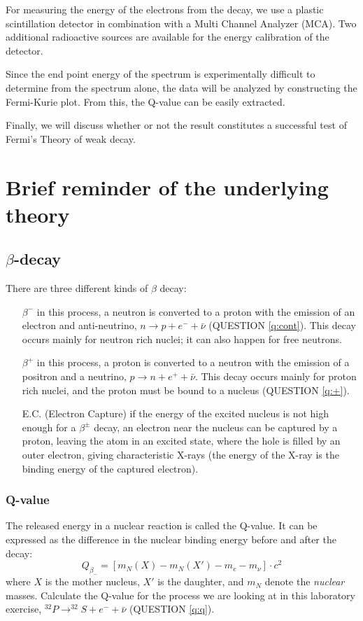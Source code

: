 \documentclass[a4,11pt, notitlepage]{article}
\begin{document}
For measuring the energy of the electrons from the decay, we use a
plastic scintillation detector in combination with a Multi Channel
Analyzer (MCA). Two additional radioactive sources are available for
the energy calibration of the detector.

Since the end point energy of the spectrum is experimentally difficult
to determine from the spectrum alone, the data will be analyzed by
constructing the Fermi-Kurie plot. From this, the Q-value can be
easily extracted.

Finally, we will discuss whether or not the result constitutes a
successful test of Fermi's Theory of weak decay.

\section{Brief reminder of the underlying theory}
\subsection{$\beta$-decay}

There are three different kinds of $\beta$ decay:
\begin{itemize}
\item[$\beta^-$] in this process, a neutron is converted to a proton with the emission of an electron and anti-neutrino, $n\rightarrow p + e^- + \bar \nu$ (QUESTION \ref{q:cont}). This decay occurs mainly for neutron rich nuclei; it can also happen for free neutrons.
\item[$\beta^+$] in this process, a proton is converted to a neutron with the emission of a positron and a neutrino, $p\rightarrow n + e^+ + \bar \nu$. This decay occurs mainly for proton rich nuclei, and the proton must be bound to a nucleus (QUESTION \ref{q:+}).
\item[E.C.] (Electron Capture) if the energy of the excited nucleus is not high enough for a $\beta^{\pm}$ decay, an electron near the nucleus can be captured by a proton, leaving the atom in an excited state, where the hole is filled by an outer electron, giving characteristic X-rays (the energy of the X-ray is the binding energy of the captured electron).
\end{itemize}

\subsubsection{Q-value}

The released energy in a nuclear reaction is called the Q-value. It can be expressed as the difference in the nuclear binding energy before and after the decay: \begin{equation}
  Q_{\beta_-}=[m_{N}(X)-m_{N}(X')-m_e-m_{\nu}]\cdot c^2
\end{equation}
where $X$ is the mother nucleus, $X'$ is the daughter, and $m_N$ denote the \textit{nuclear} masses. Calculate the Q-value for the process we are looking at in this laboratory exercise, $^{32}P\rightarrow ^{32}S + e^- + \bar{\nu}$ (QUESTION \ref{q:q}). 
\end{document}
